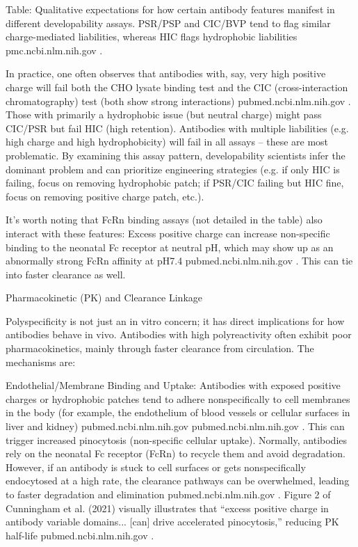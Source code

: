 Table: Qualitative expectations for how certain antibody features manifest in different developability assays. PSR/PSP and CIC/BVP tend to flag similar charge-mediated liabilities, whereas HIC flags hydrophobic liabilities
pmc.ncbi.nlm.nih.gov
.

In practice, one often observes that antibodies with, say, very high positive charge will fail both the CHO lysate binding test and the CIC (cross-interaction chromatography) test (both show strong interactions)
pubmed.ncbi.nlm.nih.gov
. Those with primarily a hydrophobic issue (but neutral charge) might pass CIC/PSR but fail HIC (high retention). Antibodies with multiple liabilities (e.g. high charge and high hydrophobicity) will fail in all assays – these are most problematic. By examining this assay pattern, developability scientists infer the dominant problem and can prioritize engineering strategies (e.g. if only HIC is failing, focus on removing hydrophobic patch; if PSR/CIC failing but HIC fine, focus on removing positive charge patch, etc.).

It’s worth noting that FcRn binding assays (not detailed in the table) also interact with these features: Excess positive charge can increase non-specific binding to the neonatal Fc receptor at neutral pH, which may show up as an abnormally strong FcRn affinity at pH7.4
pubmed.ncbi.nlm.nih.gov
. This can tie into faster clearance as well.

Pharmacokinetic (PK) and Clearance Linkage

Polyspecificity is not just an in vitro concern; it has direct implications for how antibodies behave in vivo. Antibodies with high polyreactivity often exhibit poor pharmacokinetics, mainly through faster clearance from circulation. The mechanisms are:

Endothelial/Membrane Binding and Uptake: Antibodies with exposed positive charges or hydrophobic patches tend to adhere nonspecifically to cell membranes in the body (for example, the endothelium of blood vessels or cellular surfaces in liver and kidney)
pubmed.ncbi.nlm.nih.gov
pubmed.ncbi.nlm.nih.gov
. This can trigger increased pinocytosis (non-specific cellular uptake). Normally, antibodies rely on the neonatal Fc receptor (FcRn) to recycle them and avoid degradation. However, if an antibody is stuck to cell surfaces or gets nonspecifically endocytosed at a high rate, the clearance pathways can be overwhelmed, leading to faster degradation and elimination
pubmed.ncbi.nlm.nih.gov
. Figure 2 of Cunningham et al. (2021) visually illustrates that “excess positive charge in antibody variable domains... [can] drive accelerated pinocytosis,” reducing PK half-life
pubmed.ncbi.nlm.nih.gov
.

